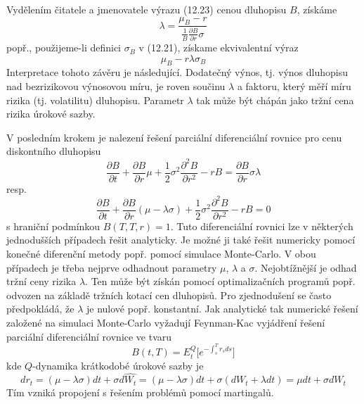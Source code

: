\documentclass[a4paper]{book}
\begin{document}
Vydělením čitatele a jmenovatele výrazu (12.23) cenou dluhopisu $B$, získáme
\begin{equation*}
\lambda = \frac{\mu_B - r}{\frac{1}{B} \frac{\partial B}{\partial r}\sigma}
\end{equation*}
popř., použijeme-li definici $\sigma_B$ v (12.21), získame ekvivalentní výraz
\begin{equation*}
\mu_B - r \lambda \sigma_B
\end{equation*}
Interpretace tohoto závěru je následující. Dodatečný výnos, tj. výnos dluhopisu nad bezrizikovou výnosovou míru, je roven součinu $\lambda$ a faktoru, který měří míru rizika (tj. volatilitu) dluhopisu. Parametr $\lambda$ tak může být chápán jako tržní cena rizika úrokové sazby.

V posledním krokem je nalezení řešení parciální diferenciální rovnice pro cenu diskontního dluhopisu
\begin{equation*}
\frac{\partial B}{\partial t} + \frac{\partial B}{\partial r}\mu + \frac{1}{2}\sigma^2 \frac{\partial^2 B}{\partial r^2} - rB = \frac{\partial B}{\partial r}\sigma \lambda
\end{equation*}
resp.
\begin{equation*}
\frac{\partial B}{\partial t} + \frac{\partial B}{\partial r}(\mu - \lambda \sigma) + \frac{1}{2}\sigma^2 \frac{\partial^2 B}{\partial r^2} - rB = 0
\end{equation*}
s hraniční podmínkou $B(T,T,r) = 1$. Tuto diferenciální rovnici lze v některých jednodušších případech řešit analyticky. Je možné ji také řešit numericky pomocí konečné diferenční metody popř. pomocí simulace Monte-Carlo. V obou případech je třeba nejprve odhadnout parametry $\mu$, $\lambda$ a $\sigma$. Nejobtížnější je odhad tržní ceny rizika $\lambda$. Ten může být získán pomocí optimalizačních programů popř. odvozen na základě tržních kotací cen dluhopisů. Pro zjednodušení se často předpokládá, že $\lambda$ je nulové popř. konstantní. Jak analytické tak numerické řešení založené na simulaci Monte-Carlo vyžadují Feynman-Kac vyjádření řešení parciální diferenciální rovnice ve tvaru
\begin{equation*}
B(t,T) = E_t^Q \Big[ e^{-\int_s^T r_s ds}\Big]
\end{equation*}
kde $Q$-dynamika krátkodobé úrokové sazby je
\begin{equation*}
d r_t = (\mu - \lambda \sigma)dt + \sigma d \hat{W_t}=(\mu - \lambda \sigma)dt + \sigma(dW_t + \lambda dt) = \mu dt + \sigma d W_t
\end{equation*}
Tím vzniká propojení s řešením problémů pomocí martingalů.
\end{document}
